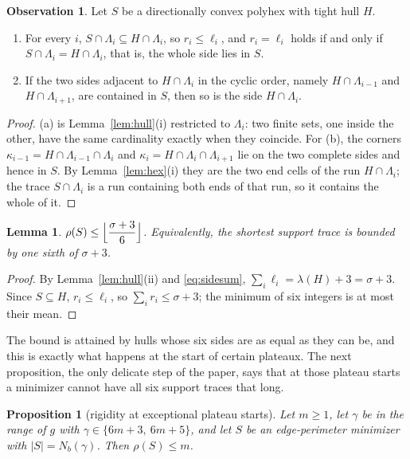 \documentclass[11pt]{article}
\theoremstyle{plain}
\newtheorem{lemma}[theorem]{Lemma}
\newtheorem{proposition}[theorem]{Proposition}
\theoremstyle{definition}
\newtheorem{observation}[theorem]{Observation}
\theoremstyle{remark}
\begin{document}
\begin{observation}\label{obs:fullside}
Let \(S\) be a directionally convex polyhex with tight hull \(H\).
\begin{enumerate}
\item[(a)] For every \(i\), \(S\cap\Lambda_{i}\subseteq H\cap\Lambda_{i}\), so
\(r_{i}\le\ell_{i}\), and \(r_{i}=\ell_{i}\) holds if and only if
\(S\cap\Lambda_{i}=H\cap\Lambda_{i}\), that is, the whole side lies in \(S\).
\item[(b)] If the two sides adjacent to \(H\cap\Lambda_{i}\) in the cyclic order, namely
\(H\cap\Lambda_{i-1}\) and \(H\cap\Lambda_{i+1}\), are contained in \(S\), then so is
the side \(H\cap\Lambda_{i}\).
\end{enumerate}
\end{observation}

\begin{proof}
(a) is Lemma~\ref{lem:hull}(i) restricted to \(\Lambda_{i}\): two finite sets, one inside
the other, have the same cardinality exactly when they coincide. For (b), the corners
\(\kappa_{i-1}=H\cap\Lambda_{i-1}\cap\Lambda_{i}\) and \(\kappa_{i}=H\cap\Lambda_{i}\cap\Lambda_{i+1}\)
lie on the two complete sides and hence in \(S\). By Lemma~\ref{lem:hex}(i) they are the
two end cells of the run \(H\cap\Lambda_{i}\); the trace \(S\cap\Lambda_{i}\) is a run
containing both ends of that run, so it contains the whole of it.
\end{proof}

\begin{lemma}\label{lem:rhobound}
\(\displaystyle \rho(S)\le\Bigl\lfloor\frac{\sigma+3}{6}\Bigr\rfloor\). Equivalently, the shortest support trace is bounded by one sixth of \(\sigma+3\).
\end{lemma}

\begin{proof}
By Lemma~\ref{lem:hull}(ii) and \eqref{eq:sidesum}, \(\sum_{i}\ell_{i}=\lambda(H)+3=\sigma+3\).
Since \(S\subseteq H\), \(r_{i}\le\ell_{i}\), so \(\sum_{i}r_{i}\le\sigma+3\); the minimum of
six integers is at most their mean.
\end{proof}

The bound is attained by hulls whose six sides are as equal as they can be, and this is
exactly what happens at the start of certain plateaux. The next proposition, the only
delicate step of the paper, says that at those plateau starts a minimizer cannot have all
six support traces that long.

\begin{proposition}[rigidity at exceptional plateau starts]\label{pro:rigidity}
Let \(m\ge1\), let \(\gamma\) be in the range of \(g\) with \(\gamma\in\{6m+3,\ 6m+5\}\),
and let \(S\) be an edge-perimeter minimizer with \(|S|=N_{b}(\gamma)\). Then
\(\rho(S)\le m\).
\end{proposition}
\end{document}
